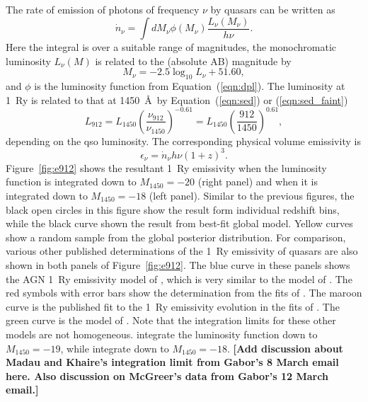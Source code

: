 \documentclass[a4paper,fleqn,usenatbib]{mnras}
\newcommand{\gk}[1]{{\bf \color{notecolor} [#1]}}
\begin{document}
The rate of emission of photons of frequency $\nu$ by quasars can be
written as
\begin{equation}
\dot n_\nu = \int dM_\nu \phi(M_\nu) \frac{L_\nu(M_\nu)}{h\nu}.
\end{equation}
Here the integral is over a suitable range of magnitudes, the
monochromatic luminosity $L_\nu(M)$ is related to the (absolute AB)
magnitude by \citep{1983ApJ...266..713O}
\begin{equation}
M_\nu = -2.5\log_{10}L_\nu+51.60,
\end{equation}
and $\phi$ is the luminosity function from Equation~(\ref{eqn:dpl}).
The luminosity at 1~Ry is related to that at 1450~\AA\ by
Equation~(\ref{eqn:sed}) or (\ref{eqn:sed_faint})
\begin{equation}
  L_{912}=L_{1450}\left(\frac{\nu_{912}}{\nu_{1450}}\right)^{-0.61}=L_{1450}\left(\frac{912}{1450}\right)^{0.61},
\end{equation}
depending on the qso luminosity.  The corresponding physical volume
emissivity is 
\begin{equation}
\epsilon_\nu = \dot n_\nu h\nu (1+z)^3.
\label{eqn:epsilon}
\end{equation}
Figure~\ref{fig:e912} shows the resultant 1~Ry emissivity when the
luminosity function is integrated down to $M_{1450}=-20$ (right panel)
and when it is integrated down to $M_{1450}=-18$ (left panel).
Similar to the previous figures, the black open circles in this figure
show the result form individual redshift bins, while the black curve
shown the result from best-fit global model.  Yellow curves show a
random sample from the global posterior distribution.  For comparison,
various other published determinations of the 1~Ry emissivity of
quasars are also shown in both panels of Figure~\ref{fig:e912}.  The
blue curve in these panels shows the AGN 1~Ry emissivity model of
\citet{2012ApJ...746..125H}, which is very similar to the model of
\citet{2007ApJ...654..731H}.  The red symbols with error bars show the
determination from the fits of \citet{2015AA...578A..83G}.  The maroon
curve is the published fit to the 1~Ry emissivity evolution in the
fits of \citet{2017MNRAS.466.1160M}.  The green curve is the model of
\citet{2015ApJ...813L...8M}.  Note that the integration limits for
these other models are not homogeneous.  \citet{2017MNRAS.466.1160M}
integrate the luminosity function down to $M_{1450}=-19$, while
\citet{2015AA...578A..83G} integrate down to $M_{1450}=-18$.  \gk{Add
  discussion about Madau and Khaire's integration limit from Gabor's 8
  March email here.  Also discussion on McGreer's data from Gabor's 12
  March email.}
\end{document}
